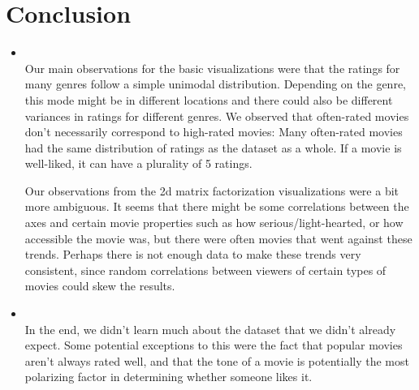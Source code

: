 \section{Conclusion}
\medskip
\begin{itemize}

    \item {} \\
    Our main observations for the basic visualizations were that the ratings for many genres follow a simple unimodal distribution. Depending on the genre, this mode might be in different locations and there could also be different variances in ratings for different genres. We observed that often-rated movies don't necessarily correspond to high-rated movies: Many often-rated movies had the same distribution of ratings as the dataset as a whole. If a movie is well-liked, it can have a plurality of 5 ratings.

    Our observations from the 2d matrix factorization visualizations were a bit more ambiguous. It seems that there might be some correlations between the axes and certain movie properties such as how serious/light-hearted, or how accessible the movie was, but there were often movies that went against these trends. Perhaps there is not enough data to make these trends very consistent, since random correlations between viewers of certain types of movies could skew the results.

    \item {} \\
    In the end, we didn't learn much about the dataset that we didn't already expect. Some potential exceptions to this were the fact that popular movies aren't always rated well, and that the tone of a movie is potentially the most polarizing factor in determining whether someone likes it.

\end{itemize}




